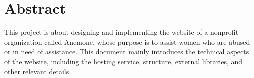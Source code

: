 \section{Abstract}
This project is about designing and implementing the website of a nonprofit organization called Anemone,
whose purpose is to assist women who are abused or in need of assistance. This document mainly introduces the technical aspects of the website, including the hosting service, structure, external libraries, and other relevant details.
